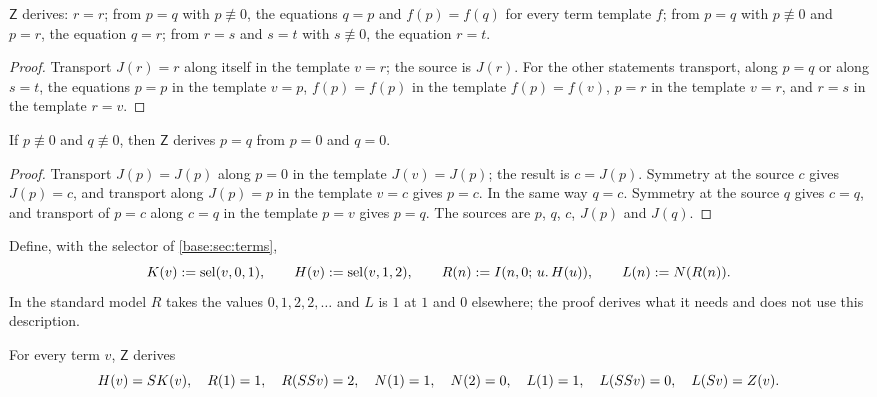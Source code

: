 \begin{lemma}
\label{kern:lem:zsafe}
$\mathsf{Z}$ derives: $r=r$; from $p=q$ with $p\not\equiv 0$, the equations
$q=p$ and $f(p)=f(q)$ for every term template $f$; from $p=q$ with
$p\not\equiv 0$ and $p=r$, the equation $q=r$; from $r=s$ and $s=t$ with
$s\not\equiv 0$, the equation $r=t$.
\end{lemma}

\begin{proof}
Transport $J(r)=r$ along itself in the template $v=r$; the source is
$J(r)$.  For the other statements transport, along $p=q$ or along $s=t$,
the equations $p=p$ in the template $v=p$, $f(p)=f(p)$ in the template
$f(p)=f(v)$, $p=r$ in the template $v=r$, and $r=s$ in the template $r=v$.
\end{proof}

\begin{lemma}
\label{kern:lem:zjoin}
If $p\not\equiv 0$ and $q\not\equiv 0$, then $\mathsf{Z}$ derives $p=q$ from
$p=0$ and $q=0$.
\end{lemma}

\begin{proof}
Transport $J(p)=J(p)$ along $p=0$ in the template $J(v)=J(p)$; the result is
$c=J(p)$.  Symmetry at the source $c$ gives $J(p)=c$, and transport along
$J(p)=p$ in the template $v=c$ gives $p=c$.  In the same way $q=c$.
Symmetry at the source $q$ gives $c=q$, and transport of $p=c$ along $c=q$
in the template $p=v$ gives $p=q$.  The sources are $p$, $q$, $c$, $J(p)$
and $J(q)$.
\end{proof}

Define, with the selector of \cref{base:sec:terms},
\[
 K(v)\mathrel{:=}\operatorname{sel}(v,0,1),\qquad H(v)\mathrel{:=}\operatorname{sel}(v,1,2),\qquad
 R(n)\mathrel{:=}I(n,0;\,u.\,H(u)),\qquad L(n)\mathrel{:=} N(R(n)).
\]
In the standard model $R$ takes the values $0,1,2,2,\dots$ and $L$ is $1$ at
$1$ and $0$ elsewhere; the proof derives what it needs and does not use this
description.

\begin{lemma}
\label{kern:lem:ztest}
For every term $v$, $\mathsf{Z}$ derives
\[
 H(v)=S K(v),\quad R(1)=1,\quad R(SS v)=2,\quad
 N(1)=1,\quad N(2)=0,\quad L(1)=1,\quad L(SS v)=0,\quad
 L(S v)=Z(v).
\]
\end{lemma}

